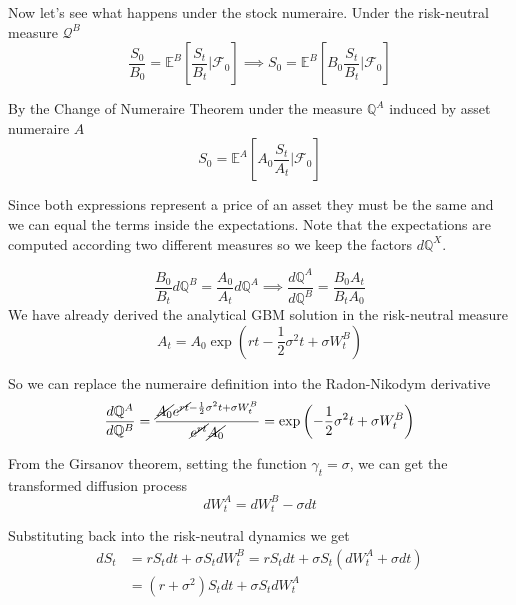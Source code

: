 \documentclass[12pt,a4paper]{book}
\begin{document}
\begin{solution}
Now let's see what happens under the stock numeraire.
Under the risk-neutral measure $\mathcal{Q}^B$
\begin{equation*}
\frac{S_0}{B_0} = \mathbb{E}^{B}\left[\frac{S_t}{B_t}\bigg|\mathcal{F}_0\right] \implies
S_0 = \mathbb{E}^{B}\left[B_0\frac{S_t}{B_t}\bigg|\mathcal{F}_0\right]
\end{equation*}

By the Change of Numeraire Theorem under the measure $\mathbb{Q}^A$ induced by asset numeraire $A$
\begin{equation*}
S_0 = \mathbb{E}^{A}\left[A_0\frac{S_t}{A_t}\bigg|\mathcal{F}_0\right]
\end{equation*}

Since both expressions represent a price of an asset they must be the same and we can equal the terms inside the expectations. Note that the expectations are computed according two different measures so we keep the factors $d\mathbb{Q}^X$. 

\begin{equation*}
\frac{B_0}{B_t}d\mathbb{Q}^B = \frac{A_0}{A_t}d\mathbb{Q}^A\implies \frac{d\mathbb{Q}^A}{d\mathbb{Q}^B}=\frac{B_0A_t}{B_tA_0}
\end{equation*}
We have already derived the analytical GBM solution in the risk-neutral measure
\begin{equation*} 
A_t = A_0 \exp\left(rt-\frac{1}{2}\sigma^2 t + \sigma W^B_t\right)
\end{equation*}

So we can replace the numeraire definition into the Radon-Nikodym derivative
\begin{equation*}
\frac{d\mathbb{Q}^A}{d\mathbb{Q}^B}=\frac{\cancel{A_0}e^{\cancel{rt}-\frac{1}{2}\sigma^2 t + \sigma W^B_t}}{\cancel{e^{rt}}\cancel{A_0}}=\exp\left(-\frac{1}{2}\sigma^2 t + \sigma W^B_t\right)
\end{equation*}

From the Girsanov theorem, setting the function $\gamma_t = \sigma$, we can get the transformed diffusion process
\begin{equation*}
dW_t^A = dW_t^B - \sigma dt 
\end{equation*}

Substituting back into the risk-neutral dynamics we get
\begin{equation*}
\begin{aligned}
dS_t &= r S_t dt + \sigma S_t dW_t^B = 
rS_t dt + \sigma S_t (dW_t^A + \sigma dt) \\
& = (r + \sigma^2)S_t dt + \sigma S_t dW^A_t
\end{aligned}
\end{equation*}


\end{solution}
\end{document}
